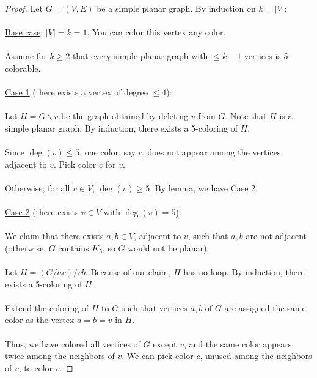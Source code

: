 \documentclass[]{article}
\theoremstyle{definition}
\begin{document}
			\begin{proof}
				Let $G = (V, E)$ be a simple planar graph. By induction on $k = |V|$:
				\\ \\
				\underline{Base case}: $|V| = k = 1$. You can color this vertex any color.
				\\ \\
				Assume for $k \ge 2$ that every simple planar graph with $\le k - 1$ vertices is 5-colorable.
				\\ \\
				\underline{Case 1} (there exists a vertex of degree $\le 4$):
				\\ \\
				Let $H = G \backslash v$ be the graph obtained by deleting $v$ from $G$. Note that $H$ is a simple planar graph. By induction, there exists a 5-coloring of $H$.
				\\ \\
				Since $\deg(v) \le 5$, one color, say $c$, does not appear among the vertices adjacent to $v$. Pick color $c$ for $v$.
				\\ \\
				Otherwise, for all $v \in V$, $\deg(v) \ge 5$. By lemma, we have Case 2.
				\\ \\
				\underline{Case 2} (there exists $v \in V$ with $\deg(v) = 5$):
				\\ \\
				We claim that there exists $a, b \in V$, adjacent to $v$, such that $a, b$ are not adjacent (otherwise, $G$ contains $K_5$, so $G$ would not be planar).
				\\ \\
				Let $H = (G/av)/vb$. Because of our claim, $H$ has no loop. By induction, there exists a 5-coloring of $H$.
				\\ \\
				Extend the coloring of $H$ to $G$ such that vertices $a, b$ of $G$ are assigned the same color as the vertex $a = b = v$ in $H$.
				\\ \\
				Thus, we have colored all vertices of $G$ except $v$, and the same color appears twice among the neighbors of $v$. We can pick color $c$, unused among the neighbors of $v$, to color $v$.
			\end{proof}
		
\end{document}
